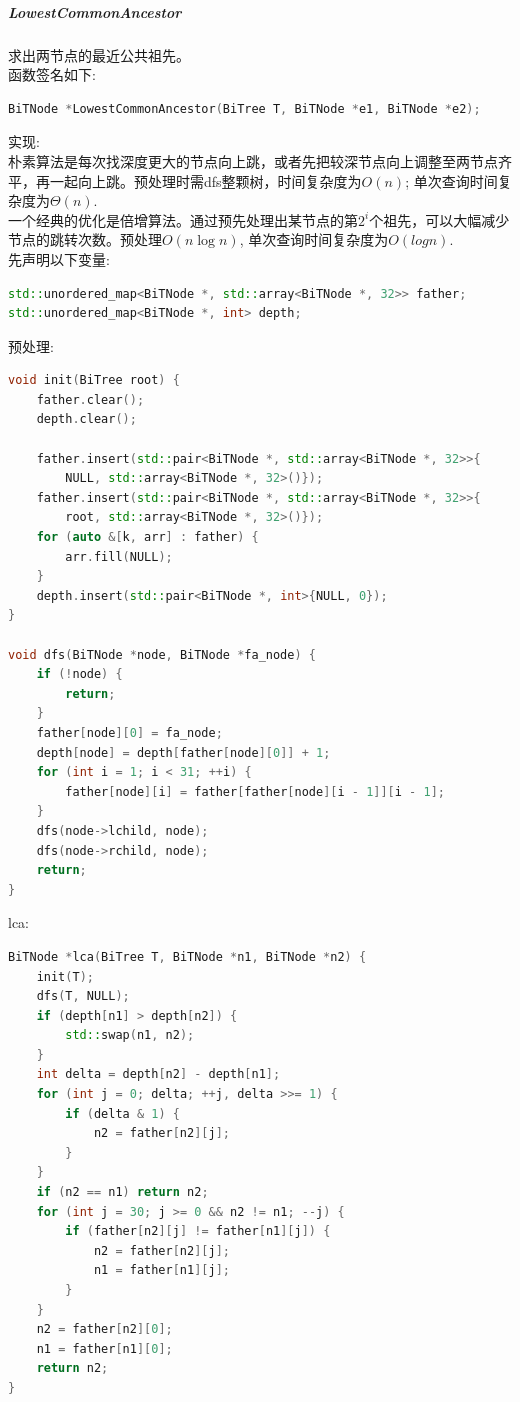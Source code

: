 \documentclass[supercite]{Experimental_Report}
\theoremstyle{definition}
\begin{document}
\subparagraph{LowestCommonAncestor}
\noindent
求出两节点的最近公共祖先。 \\
函数签名如下:
\begin{lstlisting}[language=C++, frame=single]
BiTNode *LowestCommonAncestor(BiTree T, BiTNode *e1, BiTNode *e2);
\end{lstlisting}
实现: \\
朴素算法是每次找深度更大的节点向上跳，或者先把较深节点向上调整至两节点齐平，再一起向上跳。预处理时需dfs整颗树，时间复杂度为$O(n)$; 单次查询时间复杂度为$\Theta(n)$. \\
一个经典的优化是倍增算法。通过预先处理出某节点的第$2^i$个祖先，可以大幅减少节点的跳转次数。预处理$O(n \log n)$, 单次查询时间复杂度为$O(log n)$. \\
先声明以下变量:
\begin{lstlisting}[language=C++, frame=single]
std::unordered_map<BiTNode *, std::array<BiTNode *, 32>> father;
std::unordered_map<BiTNode *, int> depth;
\end{lstlisting}
\newpage
\noindent
预处理:
\begin{lstlisting}[language=C++, frame=single]
void init(BiTree root) {
	father.clear();
	depth.clear();

	father.insert(std::pair<BiTNode *, std::array<BiTNode *, 32>>{
		NULL, std::array<BiTNode *, 32>()});
	father.insert(std::pair<BiTNode *, std::array<BiTNode *, 32>>{
		root, std::array<BiTNode *, 32>()});
	for (auto &[k, arr] : father) {
		arr.fill(NULL);
	}
	depth.insert(std::pair<BiTNode *, int>{NULL, 0});
}

void dfs(BiTNode *node, BiTNode *fa_node) {
	if (!node) {
		return;
	}
	father[node][0] = fa_node;
	depth[node] = depth[father[node][0]] + 1;
	for (int i = 1; i < 31; ++i) {
		father[node][i] = father[father[node][i - 1]][i - 1];
	}
	dfs(node->lchild, node);
	dfs(node->rchild, node);
	return;
}
\end{lstlisting}
lca:
\begin{lstlisting}[language=C++, frame=single]
BiTNode *lca(BiTree T, BiTNode *n1, BiTNode *n2) {
	init(T);
	dfs(T, NULL);
	if (depth[n1] > depth[n2]) {
		std::swap(n1, n2);
	}
	int delta = depth[n2] - depth[n1];
	for (int j = 0; delta; ++j, delta >>= 1) {
		if (delta & 1) {
			n2 = father[n2][j];
		}
	}
	if (n2 == n1) return n2;
	for (int j = 30; j >= 0 && n2 != n1; --j) {
		if (father[n2][j] != father[n1][j]) {
			n2 = father[n2][j];
			n1 = father[n1][j];
		}
	}
	n2 = father[n2][0];
	n1 = father[n1][0];
	return n2;
}
\end{lstlisting}
\end{document}
